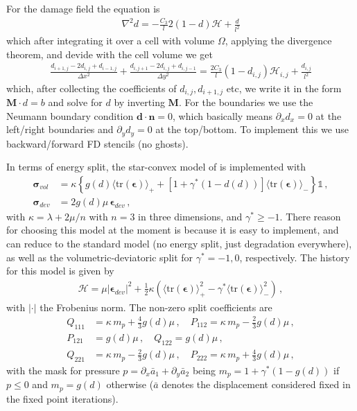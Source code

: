 \documentclass[11pt,a4paper]{article}
\newcommand{\p}{\partial}
\newcommand{\bb}[1]{\boldsymbol{#1}}
\newcommand{\tr}{\text{tr}}
\begin{document}
For the damage field the equation is
\begin{align*}
    \nabla^2 d = -\frac{C_3}{l} 2 \left(1-d\right)\mathcal{H} + \frac{d}{l^2}
\end{align*}
which after integrating it over a cell with volume $\Omega$, applying the divergence theorem, and devide with the cell volume we get
\begin{align*}
    \frac{d_{i+1,j} - 2d_{i,j} + d_{i-1,j}}{\Delta x^2}
    +
    \frac{d_{i,j+1} - 2d_{i,j} + d_{i,j-1}}{\Delta y^2}
    =
    \frac{2 C_3}{l} \left(1 - d_{i,j} \right) \mathcal{H}_{i,j}
    + \frac{d_{i,j}}{l^2}
\end{align*}
which, after collecting the coefficients of $d_{i,j}, d_{i+1,j}$ etc, we write it in the form $\mathbf{M} \cdot d = b$ and solve for $d$ by inverting $\mathbf{M}$. For the boundaries we use the Neumann boundary condition $\mathbf{d} \cdot \mathbf{n} = 0$, which basically means $\p_x d_x = 0$ at the left/right boundaries and $\p_y d_y = 0$ at the top/bottom. To implement this we use backward/forward FD stencils (no ghosts).

In terms of energy split, the star-convex model of \cite{Vicentini2024} is implemented with
\begin{align*}
    \mathbf{\sigma}_{vol} 
    & =
    \kappa
    \left\{ 
       g(d) \langle \tr{(\bb{\epsilon})}\rangle_+
       +  
       \left[ 1 + \gamma^* (1-d(d))\right] 
       \langle \tr{(\bb{\epsilon})}\rangle_-
    \right\}
    \mathbb{1}
    \,,
    \\
    \mathbf{\sigma}_{dev} 
    & =
    2 g(d) \mu \,
    \bb{\epsilon}_{dev}
    \,,
\end{align*}
with $\kappa = \lambda + 2 \mu / n$ with $n=3$ in three dimensions, and $\gamma^* \geq -1$. There reason for choosing this model at the moment is because it is easy to implement, and can reduce to the standard model (no energy split, just degradation everywhere), as well as the volumetric-deviatoric split for $\gamma^*=-1,0$, respectively. The history for this model is given by
\begin{align*}
    \mathcal{H} = \mu |\bb{\epsilon}_{dev}|^2 
    + \frac{1}{2}\kappa 
    \left(
        \langle \tr(\bb{\epsilon})\rangle_+^2
        - \gamma^*
        \langle \tr(\bb{\epsilon})\rangle_-^2
    \right)
    \,,
\end{align*}
with $|\cdot|$ the Frobenius norm. The non-zero split coefficients are
\begin{align*}
    Q_{111} 
    & = \kappa \, m_p + \frac{4}{3} g(d) \mu
    \,,
    \quad
    P_{112}
    = \kappa \, m_p - \frac{2}{3} g(d) \mu
    \,,
    \\
    P_{121} 
    & = g(d) \mu
    \,,
    \quad
    Q_{122} 
    = g(d) \mu
    \,,
    \\
    Q_{221} 
    & = \kappa \, m_p - \frac{2}{3} g(d) \mu
    \,,
    \quad
    P_{222} = \kappa \, m_p + \frac{4}{3} g(d) \mu
    \,, 
\end{align*}
with the mask for pressure $p = \p_x \bar{a}_1 + \p_y \bar{a}_2$ being $m_p = 1 + \gamma^* (1-g(d))$ if $p \leq 0 $ and $m_p = g(d)$ otherwise ($\bar{a}$ denotes the displacement considered fixed in the fixed point iterations).
\end{document}
